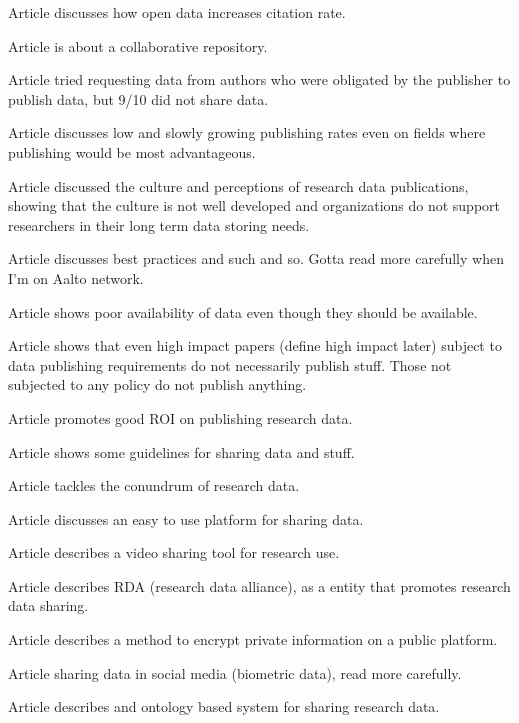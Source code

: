 Article \cite{piwowar2007sharing} discusses how open data increases citation
rate.

Article \cite{howison2005ossmole} is about a collaborative repository.

Article \cite{savage2009empirical} tried requesting data from authors who were
obligated by the publisher to publish data, but 9/10 did not share data.

Article \cite{piwowar2011shares} discusses low and slowly growing publishing
rates even on fields where publishing would be most advantageous.

Article \cite{tenopir2011data} discussed the culture and perceptions of
research data publications, showing that the culture is not well developed
and organizations do not support  researchers in their long term data storing
needs.

Article \cite{whitlock2011data} discusses best practices and such and so.
Gotta read more carefully when I'm on Aalto network.

Article \cite{wicherts2006poor} shows poor availability of data even though
they should be available.

Article \cite{alsheikh2011public} shows that even high impact papers (define
high impact later) subject to data publishing requirements do not necessarily
publish stuff. Those not subjected to any policy do not publish anything.

Article \cite{piwowar2011data} promotes good ROI on publishing research data.

Article \cite{hrynaszkiewicz2010preparing} shows some guidelines for sharing
data and stuff.

Article \cite{DBLP:journals/jasis/Borgman12} tackles the conundrum of research
data.

Article \cite{DBLP:conf/isiwi/AlamMS15} discusses an easy to use platform for
sharing data.

Article \cite{DBLP:conf/jcdl/SimonGSG15} describes a video sharing tool for research
use.

Article \cite{DBLP:journals/dlib/BermanWW14} describes RDA (research data
alliance), as a entity that promotes research data sharing.

Article \cite{DBLP:journals/jam/NohCJ14a} describes a method to encrypt private
information on a public platform.

Article \cite{DBLP:conf/ACMdis/CurmiFW14a} sharing data in social media
(biometric data), read more carefully.

Article \cite{DBLP:conf/esws/EkaputraSSB14} describes and ontology based
system for sharing research data.

